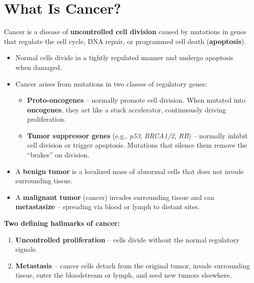 \documentclass[11pt, letterpaper]{article}
\begin{document}
\vspace{8pt}

\section*{What Is Cancer?}

Cancer is a disease of \textbf{uncontrolled cell division} caused by mutations in genes that regulate the cell cycle, DNA repair, or programmed cell death (\textbf{apoptosis}).

\begin{itemize}[noitemsep]
  \item Normal cells divide in a tightly regulated manner and undergo apoptosis when damaged.
  \item Cancer arises from mutations in two classes of regulatory genes:
    \begin{itemize}[noitemsep]
      \item \textbf{Proto-oncogenes} -- normally promote cell division. When mutated into \textbf{oncogenes}, they act like a stuck accelerator, continuously driving proliferation.
      \item \textbf{Tumor suppressor genes} (e.g., \textit{p53}, \textit{BRCA1/2}, \textit{RB}) -- normally inhibit cell division or trigger apoptosis. Mutations that silence them remove the ``brakes'' on division.
    \end{itemize}
  \item A \textbf{benign tumor} is a localized mass of abnormal cells that does not invade surrounding tissue.
  \item A \textbf{malignant tumor} (cancer) invades surrounding tissue and can \textbf{metastasize} -- spreading via blood or lymph to distant sites.
\end{itemize}

\begin{tcolorbox}[colback=partbg, colframe=sectionblue, arc=3pt, boxrule=1pt]
\textbf{Two defining hallmarks of cancer:}
\begin{enumerate}[noitemsep, leftmargin=*]
  \item \textbf{Uncontrolled proliferation} -- cells divide without the normal regulatory signals.
  \item \textbf{Metastasis} -- cancer cells detach from the original tumor, invade surrounding tissue, enter the bloodstream or lymph, and seed new tumors elsewhere.
\end{enumerate}
\end{tcolorbox}
\end{document}

